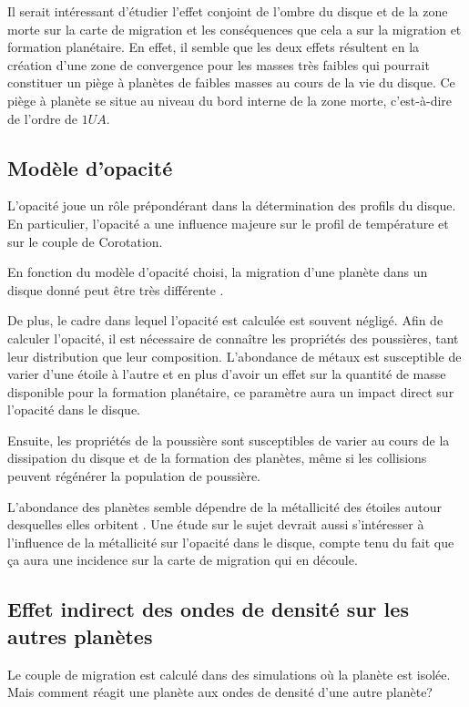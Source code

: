 Il serait intéressant d'étudier l'effet conjoint de l'ombre du disque et de la zone morte sur la carte de migration et les conséquences que cela a sur la migration et formation planétaire. En effet, il semble que les deux effets résultent en la création d'une zone de convergence pour les masses très faibles  qui pourrait constituer un piège à planètes de faibles masses au cours de la vie du disque. Ce piège à planète se situe au niveau du bord interne de la zone morte, c'est-à-dire de l'ordre de $1\unit{UA}$.

\subsection{Modèle d'opacité}
L'opacité joue un rôle prépondérant dans la détermination des profils du disque. En particulier, l'opacité a une influence
majeure sur le profil de température et sur le couple de Corotation. 

En fonction du modèle d'opacité choisi, la migration d'une planète dans un disque donné peut être très différente . 

De plus, le cadre dans lequel l'opacité est calculée est souvent négligé. Afin de calculer l'opacité, il est nécessaire de
connaître les propriétés des poussières, tant leur distribution que leur composition. L'abondance de métaux est susceptible de
varier d'une étoile à l'autre et en plus d'avoir un effet sur la quantité de masse disponible pour la formation planétaire, ce
paramètre aura un impact direct sur l'opacité dans le disque. 

Ensuite, les propriétés de la poussière sont susceptibles de varier au cours de la dissipation du disque et de la formation des planètes, même si les collisions peuvent régénérer la population de poussière.

L'abondance des planètes semble dépendre de la métallicité des étoiles autour desquelles elles orbitent
\citep{fischer2005planet}. Une étude sur le sujet devrait aussi s'intéresser à l'influence de la métallicité sur l'opacité dans
le disque, compte tenu du fait que ça aura une incidence sur la carte de migration qui en découle.

\subsection{Effet indirect des ondes de densité sur les autres planètes}
Le couple de migration est calculé dans des simulations où la planète est isolée. Mais comment réagit une planète aux ondes de
densité d'une autre planète? 

